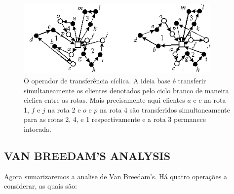 \begin{figure}[!ht]
\centering
\includegraphics[width=10cm]{./fig/thompPsar.png}
\caption{O operador de transferência cíclica. A ideia base é transferir simultaneamente os clientes
denotados pelo ciclo branco de maneira ciclica entre as rotas. Mais precisamente aqui clientes $a$ e
$c$ na rota 1, $f$ e $j$ na rota 2 e $o$ e $p$ na rota 4 são transferidos simultaneamente para as
rotas 2, 4, e 1 respectivamente e a rota 3 permanece intocada.}
\end{figure}

\subsection{VAN BREEDAM'S ANALYSIS}

 Agora sumarizaremos a analise de Van Breedam's. Há quatro operações a considerar, as quais são:

